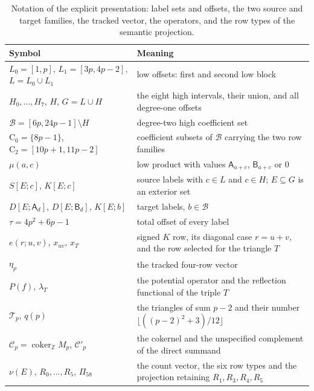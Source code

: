 \documentclass[11pt]{article}
\theoremstyle{definition}
\theoremstyle{remark}
\newcommand{\Z}{\mathbb Z}
\begin{document}
\begin{table}[t]
\centering\small
\begin{tabular}{>{\raggedright\arraybackslash}p{}>{\raggedright\arraybackslash}p{}}
\toprule
Symbol & Meaning\\
\midrule
$L_0=[1,p]$, $L_1=[3p,4p-2]$, $L=L_0\cup L_1$ & low offsets: first and second low block\\[2pt]
$H_0,\ldots,H_7$, $H$, $G=L\cup H$ & the eight high intervals, their union, and all degree-one offsets\\[2pt]
$\mathcal B=[6p,24p-1]\setminus H$ & degree-two high coefficient set\\[2pt]
$\mathrm C_0=\{8p-1\}$, $\mathrm C_2=[10p+1,11p-2]$ & coefficient subsets of $\mathcal B$ carrying the two row families\\[2pt]
$\mu(a,c)$ & low product with values $\mathsf A_{a+c}$, $\mathsf B_{a+c}$ or $0$\\[2pt]
$S[E;c]$, $K[E;c]$ & source labels with $c\in L$ and $c\in H$; $E\subseteq G$ is an exterior set\\[2pt]
$D[E;\mathsf A_d]$, $D[E;\mathsf B_d]$, $K[E;b]$ & target labels, $b\in\mathcal B$\\[2pt]
$\tau=4p^2+6p-1$ & total offset of every label\\[2pt]
$e(r;u,v)$, $x_{uv}$, $x_T$ & signed $K$ row, its diagonal case $r=u+v$, and the row selected for the triangle $T$\\[2pt]
$\eta_p$ & the tracked four-row vector\\[2pt]
$P(f)$, $\lambda_T$ & the potential operator and the reflection functional of the triple $T$\\[2pt]
$\mathcal T_p$, $q(p)$ & the triangles of sum $p-2$ and their number $\lfloor((p-2)^2+3)/12\rfloor$\\[2pt]
$\mathcal C_p=\operatorname{coker}_{\Z}M_p$, $\mathcal C'_p$ & the cokernel and the unspecified complement of the direct summand\\[2pt]
$\nu(E)$, $R_0,\ldots,R_5$, $\Pi_{58}$ & the count vector, the six row types and the projection retaining $R_1,R_3,R_4,R_5$\\
\bottomrule
\end{tabular}
\caption{Notation of the explicit presentation: label sets and offsets, the two source and target families, the tracked vector, the operators, and the row types of the semantic projection.}
\label{tab:notation}
\end{table}
\end{document}
